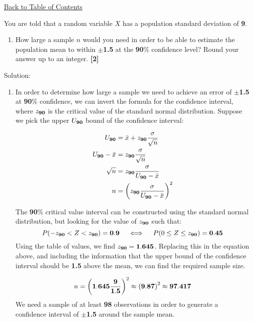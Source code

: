 \documentclass[a4paper, leqno, 12pt]{report}
\newenvironment{top_enumerate}{
\begin{enumerate}
  \setlength{\itemsep}{2em}
  \setlength{\topsep}{-0pt}
  \setlength{\partopsep}{-0pt}
}{\end{enumerate}}
\begin{document}
\hyperlink{contents}{Back to Table of Contents}
\begin{top_enumerate}
\item You are told that a random variable $X$ has a population standard deviation of {\bf 9}.
 
\setcounter{equation}{0}  %
\begin{enumerate}
	\setlength{\topsep}{-0pt}
	\setlength{\partopsep}{-0pt}
	\setlength{\itemsep}{10pt}
			\item How large a sample $n$ would you need in order to be able to estimate the population mean to within $\pm${\bf 1.5} at the {\bf 90}\% confidence level? Round your answer up to an integer.
	 \quad \textbf{[2]}
\end{enumerate}\addtocounter{enumi}{-1}
\item Solution:
 
\setcounter{equation}{0}  %
\begin{enumerate}
	\setlength{\topsep}{-0pt}
	\setlength{\partopsep}{-0pt}
	\setlength{\itemsep}{10pt}
			\item In order to determine how large a sample we need to achieve an error of $\pm${\bf 1.5} at {\bf 90}\% confidence, we can invert the formula for the confidence interval, where $z_{{\bf 90}}$ is the critical value of the standard normal distribution. Suppose we pick the upper $U_{{\bf 90}}$ bound of the confidence interval:
	
	\[
	\begin{aligned}
	U_{{\bf 90}} & = \bar x + z_{{\bf 90}} \frac{\sigma}{\sqrt{n}}\\
	U_{{\bf 90}} - \bar x  & = z_{{\bf 90}} \frac{\sigma}{\sqrt{n}}\\
	\sqrt{n} & =z_{{\bf 90}} \frac{\sigma}{U_{{\bf 90}} - \bar x} \\
	n & = \left(z_{{\bf 90}} \frac{\sigma}{U_{{\bf 90}} - \bar x}\right)^2 \\
	\end{aligned}
	\]
	
	The {\bf 90}\% critical value interval can be constructed using the standard normal distribution, but looking for the value of $z_{{\bf 90}}$ such that:
	\[
	P(-z_{{\bf 90}} < Z < z_{{\bf 90}}) = {\bf 0.9} \quad \iff \quad P(0 \le Z \le z_{{\bf 90}}) = {\bf 0.45}
	\]
	Using the table of values, we find $z_{{\bf 90}} = {\bf 1.645}$. Replacing this in the equation above, and including the information that the upper bound of the confidence interval should be {\bf 1.5} above the mean, we can find the required sample size.
	
	\[
	n = \left({\bf 1.645} \frac{{\bf 9}}{{\bf 1.5}}\right)^2 \approx \left({\bf 9.87}\right)^2 \approx {\bf 97.417}
	\]
	We need a sample of at least {\bf 98} observations in order to generate a confidence interval of $\pm${\bf 1.5} around the sample mean.
	 \quad \textbf{}
\end{enumerate}\newpage
\end{top_enumerate}
\end{document}
